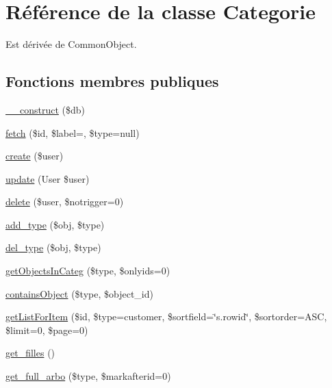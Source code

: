 \hypertarget{classCategorie}{}\section{Référence de la classe Categorie}
\label{classCategorie}


Est dérivée de Common\+Object.

\subsection*{Fonctions membres publiques}
\begin{DoxyCompactItemize}
\item 
\hyperlink{classCategorie_a930c56100b1604ac5ba86f6e926a3e18}{\+\_\+\+\_\+construct} (\$db)
\item 
\hyperlink{classCategorie_acf59d89f7b73771877a47a5c6f8c098a}{fetch} (\$id, \$label=\textquotesingle{}\textquotesingle{}, \$type=null)
\item 
\hyperlink{classCategorie_ac6cdd8f55e4881375c2e0051ef5baa90}{create} (\$user)
\item 
\hyperlink{classCategorie_ad7f52b3a7530b26a57c1d0878be65e00}{update} (User \$user)
\item 
\hyperlink{classCategorie_aef3286a2e9471dc1824af192f67e4f5d}{delete} (\$user, \$notrigger=0)
\item 
\hyperlink{classCategorie_a82ea5b98392cff02d6caa546209ef891}{add\+\_\+type} (\$obj, \$type)
\item 
\hyperlink{classCategorie_a53f7505a40a26e6283c2060b60c04a7f}{del\+\_\+type} (\$obj, \$type)
\item 
\hyperlink{classCategorie_a256c5a47b5512de27154c1eeec7ec2ca}{get\+Objects\+In\+Categ} (\$type, \$onlyids=0)
\item 
\hyperlink{classCategorie_a8b688e0b1b0b9bf594cbb69c31d3004b}{contains\+Object} (\$type, \$object\+\_\+id)
\item 
\hyperlink{classCategorie_a0f8958a784bddf8c077c33ba15978eb8}{get\+List\+For\+Item} (\$id, \$type=\textquotesingle{}customer\textquotesingle{}, \$sortfield=\char`\"{}s.\+rowid\char`\"{}, \$sortorder=\textquotesingle{}A\+SC\textquotesingle{}, \$limit=0, \$page=0)
\item 
\hyperlink{classCategorie_a71de352171d73a9c94582aba5f28f00c}{get\+\_\+filles} ()
\item 
\hyperlink{classCategorie_ae3c0589c189107827addce4f99281f07}{get\+\_\+full\+\_\+arbo} (\$type, \$markafterid=0)
\item 

\end{DoxyCompactItemize}
